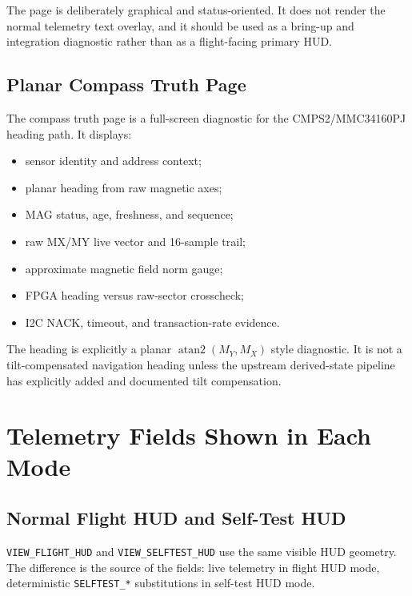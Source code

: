 \documentclass{article}
\newcommand{\sig}[1]{\begingroup\nolinkurl{#1}\endgroup}
\begin{document}
The page is deliberately graphical and status-oriented.  It does not render the
normal telemetry text overlay, and it should be used as a bring-up and
integration diagnostic rather than as a flight-facing primary HUD.

\subsection{Planar Compass Truth Page}

The compass truth page is a full-screen diagnostic for the CMPS2/MMC34160PJ
heading path.  It displays:

\begin{itemize}
  \item sensor identity and address context;
  \item planar heading from raw magnetic axes;
  \item MAG status, age, freshness, and sequence;
  \item raw MX/MY live vector and 16-sample trail;
  \item approximate magnetic field norm gauge;
  \item FPGA heading versus raw-sector crosscheck;
  \item I2C NACK, timeout, and transaction-rate evidence.
\end{itemize}

The heading is explicitly a planar \(\operatorname{atan2}(M_Y,M_X)\) style
diagnostic.  It is not a tilt-compensated navigation heading unless the upstream
derived-state pipeline has explicitly added and documented tilt compensation.

\section{Telemetry Fields Shown in Each Mode}

\subsection{Normal Flight HUD and Self-Test HUD}

\sig{VIEW_FLIGHT_HUD} and \sig{VIEW_SELFTEST_HUD} use the same visible HUD
geometry.  The difference is the source of the fields: live telemetry in flight
HUD mode, deterministic \sig{SELFTEST_*} substitutions in self-test HUD mode.
\end{document}
